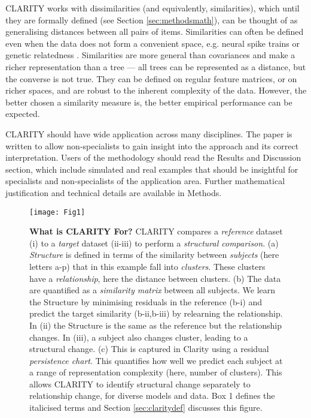 \documentclass[a4]{article}
\newcommand{\+}[1]{\mathbf{#1}}
\begin{document}
CLARITY works with dissimilarities (and equivalently, similarities), which until they are formally defined (see Section \ref{sec:methodsmath}), can be thought of as generalising distances between all pairs of items. 
Similarities can often be defined even when the data does not form a convenient space, e.g. neural spike trains \cite{victor1997metric} or genetic relatedness \cite{lawson_inference_2012}. Similarities are more general than covariances and make a richer representation than a tree --- all trees can be represented as a distance, but the converse is not true. They can be defined on regular feature matrices, or on richer spaces, and are robust to the inherent complexity of the data. However, the better chosen a similarity measure is, the better empirical performance can be expected.

CLARITY should have wide application across many disciplines. The paper is written to allow non-specialists to gain insight into the approach and its correct interpretation. Users of the methodology should read the Results and Discussion section, which include simulated and real examples that should be insightful for specialists and non-specialists of the application area. Further mathematical justification and technical details are available in Methods.

\begin{figure}[!ht]
\begin{center}
 \centerline{\texttt{[image: Fig1]}}
 \caption{
   {\bf What is CLARITY For?} CLARITY compares a \emph{reference} dataset (i) to a \emph{target} dataset (ii-iii) to perform a \emph{structural comparison}.
   (a) \emph{Structure} is defined in terms of the similarity between \emph{subjects} (here letters a-p) that in this example fall into \emph{clusters}. These clusters have a \emph{relationship}, here the distance between clusters.
   (b) The data are quantified as a \emph{similarity matrix} between all subjects. We learn the Structure by minimising residuals in the reference (b-i) and predict the target similarity (b-ii,b-iii) by relearning the relationship. In (ii) the Structure is the same as the reference but the relationship changes. In (iii), a subject also changes cluster, leading to a structural change.
   (c) This is captured in Clarity using a residual \emph{persistence chart}. This quantifies how well we predict each subject at a range of representation complexity (here, number of clusters). This allows CLARITY to identify structural change separately to relationship change, for diverse models and data. Box 1 defines the italicised terms and Section \ref{sec:claritydef} discusses this figure.}
   \label{fig:sim1}
\end{center}
\end{figure}
\end{document}
